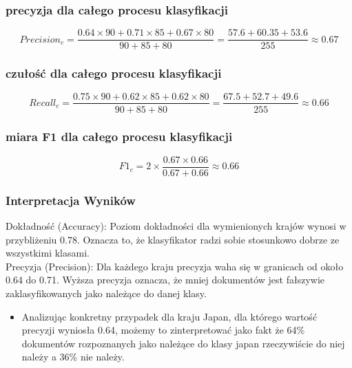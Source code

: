 \documentclass{article}
\begin{document}
\subsubsection*{precyzja dla całego procesu klasyfikacji}
\begin{equation}
    Precision_c = \frac{0.64 \times 90 + 0.71 \times 85 + 0.67 \times 80}{90 + 85 + 80} = \frac{57.6 + 60.35 + 53.6}{255} \approx 0.67 
\end{equation}

\subsubsection*{czułość dla całego procesu klasyfikacji}
\begin{equation}
    Recall_c = \frac{0.75 \times 90 + 0.62 \times 85 + 0.62 \times 80}{90 + 85 + 80} = \frac{67.5 + 52.7 + 49.6}{255} \approx 0.66
\end{equation}

\subsubsection*{miara F1 dla całego procesu klasyfikacji}
\begin{equation}
    F1_c = 2 \times \frac{0.67 \times 0.66}{0.67 + 0.66} \approx 0.66
\end{equation}

\subsubsection*{Interpretacja Wyników}

Dokładność (Accuracy): Poziom dokładności dla wymienionych krajów wynosi w przybliżeniu 0.78. Oznacza to, że klasyfikator radzi sobie stosunkowo dobrze ze wszystkimi klasami.\\

\noindent Precyzja (Precision): Dla każdego kraju precyzja waha się w granicach od około 0.64 do 0.71. Wyższa precyzja oznacza, że mniej dokumentów jest fałszywie zaklasyfikowanych jako należące do danej klasy.
\begin{itemize}
    \item Analizując konkretny przypadek dla kraju Japan, dla którego wartość precyzji wyniosła 0.64, możemy to zinterpretować jako fakt że 64\% dokumentów rozpoznanych jako należące do klasy japan rzeczywiście do niej należy a 36\% nie należy.\\
\end{itemize}
\end{document}
